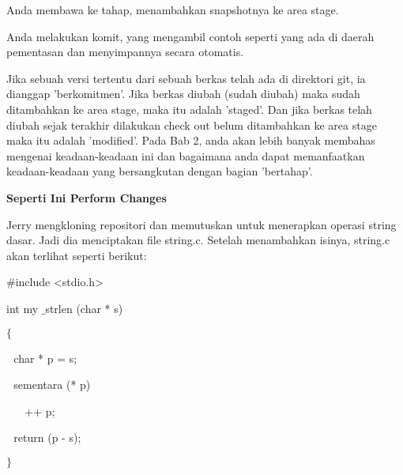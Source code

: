 \noindent 
Anda membawa ke tahap, menambahkan snapshotnya ke area stage. \par
\noindent 
Anda melakukan komit, yang mengambil contoh seperti yang ada di daerah pementasan dan menyimpannya secara otomatis. \par
\noindent 
Jika sebuah versi tertentu dari sebuah berkas telah ada di direktori git, ia dianggap 'berkomitmen'. Jika berkas diubah (sudah diubah) maka sudah ditambahkan ke area stage, maka itu adalah 'staged'. Dan jika berkas telah diubah sejak terakhir dilakukan check out belum ditambahkan ke area stage maka itu adalah 'modified'. Pada Bab 2, anda akan lebih banyak membahas mengenai keadaan-keadaan ini dan bagaimana anda dapat memanfaatkan keadaan-keadaan yang bersangkutan dengan bagian 'bertahap'. \par
\vspace{12pt}
\noindent 
{\fontsize{14pt}{14pt}\selectfont \textbf{Seperti Ini Perform Changes} \\} \par
\noindent 
Jerry mengkloning repositori dan memutuskan untuk menerapkan operasi string dasar. Jadi dia menciptakan file string.c. Setelah menambahkan isinya, string.c akan terlihat seperti berikut: \par
\vspace{12pt}
\noindent 
 \hspace*{0.5in}  $  \#  $include <stdio.h> \par
\vspace{12pt}
\noindent 
 \hspace*{0.5in} int my $  \_  $strlen (char * s) \par
\noindent 
 \hspace*{0.5in}  $  \{  $ \par
\noindent 
 \hspace*{0.5in}  $  $ $  $ $  $char * p = s; \par
\vspace{12pt}
\noindent 
 \hspace*{0.5in}  $  $ $  $ $  $sementara (* p) \par
\noindent 
 \hspace*{0.5in}  $  $ $  $ $  $ $  $ $  $ $  $++ p; \par
\vspace{12pt}
\noindent 
 \hspace*{0.5in}  $  $ $  $ $  $return (p - s); \par
\noindent 
 \hspace*{0.5in}  $  \}  $ \par
